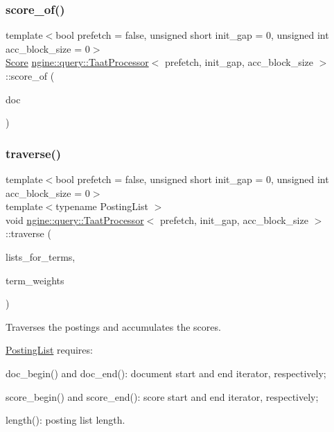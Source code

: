 \subsubsection{\texorpdfstring{score\+\_\+of()}{score\_of()}}
{\footnotesize\ttfamily template$<$bool prefetch = false, unsigned short init\+\_\+gap = 0, unsigned int acc\+\_\+block\+\_\+size = 0$>$ \\
\hyperlink{structngine_1_1Score}{Score} \hyperlink{classngine_1_1query_1_1TaatProcessor}{ngine\+::query\+::\+Taat\+Processor}$<$ prefetch, init\+\_\+gap, acc\+\_\+block\+\_\+size $>$\+::score\+\_\+of (\begin{DoxyParamCaption}\item[{\hyperlink{structngine_1_1Doc}{Doc}}]{doc }\end{DoxyParamCaption})\hspace{0.3cm}{\ttfamily [inline]}}

\mbox{\label{classngine_1_1query_1_1TaatProcessor_a8a7e81f810fcef5c98f1221290a793bd}} 
\subsubsection{\texorpdfstring{traverse()}{traverse()}}
{\footnotesize\ttfamily template$<$bool prefetch = false, unsigned short init\+\_\+gap = 0, unsigned int acc\+\_\+block\+\_\+size = 0$>$ \\
template$<$typename Posting\+List $>$ \\
void \hyperlink{classngine_1_1query_1_1TaatProcessor}{ngine\+::query\+::\+Taat\+Processor}$<$ prefetch, init\+\_\+gap, acc\+\_\+block\+\_\+size $>$\+::traverse (\begin{DoxyParamCaption}\item[{std\+::vector$<$ \hyperlink{classngine_1_1PostingList}{Posting\+List} $>$ \&}]{lists\+\_\+for\+\_\+terms,  }\item[{const std\+::vector$<$ \hyperlink{structngine_1_1Score}{Score} $>$ \&}]{term\+\_\+weights }\end{DoxyParamCaption})\hspace{0.3cm}{\ttfamily [inline]}}

Traverses the postings and accumulates the scores.

\hyperlink{classngine_1_1PostingList}{Posting\+List} requires\+:
\begin{DoxyItemize}
\item doc\+\_\+begin() and doc\+\_\+end()\+: document start and end iterator, respectively;
\item score\+\_\+begin() and score\+\_\+end()\+: score start and end iterator, respectively;
\item length()\+: posting list length. 
\end{DoxyItemize}

